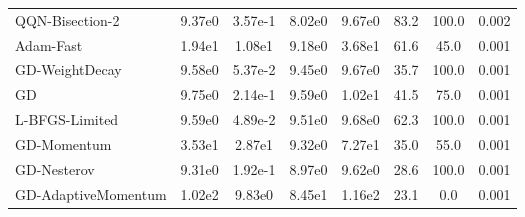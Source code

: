 \documentclass{article}
\begin{document}
\begin{table}[htbp]
{\begin{tabular}{p{2.5cm}*{7}{c}}
QQN-Bisection-2 & 9.37e0 & 3.57e-1 & 8.02e0 & 9.67e0 & 83.2 & 100.0 & 0.002 \\
Adam-Fast & 1.94e1 & 1.08e1 & 9.18e0 & 3.68e1 & 61.6 & 45.0 & 0.001 \\
GD-WeightDecay & 9.58e0 & 5.37e-2 & 9.45e0 & 9.67e0 & 35.7 & 100.0 & 0.001 \\
GD & 9.75e0 & 2.14e-1 & 9.59e0 & 1.02e1 & 41.5 & 75.0 & 0.001 \\
L-BFGS-Limited & 9.59e0 & 4.89e-2 & 9.51e0 & 9.68e0 & 62.3 & 100.0 & 0.001 \\
GD-Momentum & 3.53e1 & 2.87e1 & 9.32e0 & 7.27e1 & 35.0 & 55.0 & 0.001 \\
GD-Nesterov & 9.31e0 & 1.92e-1 & 8.97e0 & 9.62e0 & 28.6 & 100.0 & 0.001 \\
GD-AdaptiveMomentum & 1.02e2 & 9.83e0 & 8.45e1 & 1.16e2 & 23.1 & 0.0 & 0.001 \\
\bottomrule
\end{tabular}
}
\end{table}
\end{document}
